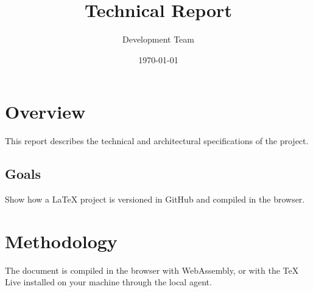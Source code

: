 \documentclass[12pt]{report}
\title{Technical Report}
\author{Development Team}
\date{\today}
\begin{document}
\maketitle
\tableofcontents

\chapter{Overview}
This report describes the technical and architectural specifications of the project.

\section{Goals}
Show how a LaTeX project is versioned in GitHub and compiled in the browser.

\chapter{Methodology}
The document is compiled in the browser with WebAssembly, or with the TeX Live installed on your machine through the local agent.
\end{document}
